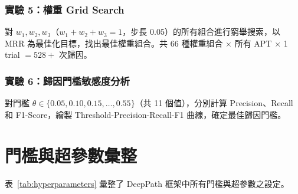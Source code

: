 \begin{ZhChapter}
\subsubsection{實驗 5：權重 Grid Search}
\label{subsec:exp5}

對 $w_1, w_2, w_3$（$w_1 + w_2 + w_3 = 1$，步長 0.05）的所有組合進行窮舉搜索，以 MRR 為最佳化目標，找出最佳權重組合。共 66 種權重組合 $\times$ 所有 APT $\times$ 1 trial $= 528+$ 次歸因。

\subsubsection{實驗 6：歸因門檻敏感度分析}
\label{subsec:exp6}

對門檻 $\theta \in \{0.05, 0.10, 0.15, \ldots, 0.55\}$（共 11 個值），分別計算 Precision、Recall 和 F1-Score，繪製 Threshold-Precision-Recall-F1 曲線，確定最佳歸因門檻。


\section{門檻與超參數彙整}
\label{sec:hyperparameters}

表~\ref{tab:hyperparameters} 彙整了 DeepPath 框架中所有門檻與超參數之設定。


\end{ZhChapter}
